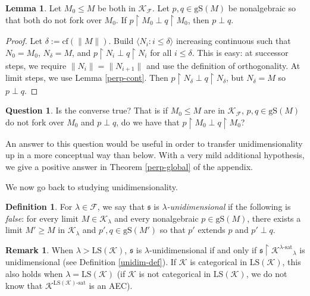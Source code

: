 \documentclass[12pt]{amsart}
\theoremstyle{definition}
\newtheorem{lem}[mydef]{Lemma}
\newtheorem{question}[mydef]{Question}
\newtheorem{defin}[mydef]{Definition}
\newtheorem{remark}[mydef]{Remark}
\begin{document}
\begin{lem}\label{perp-nf-1}
  Let $M_0 {\le} M$ be both in ${\mathcal{K}}_{\mathcal{F}}$. Let $p, q \in {\text{gS}} (M)$ be nonalgebraic so that both do not fork over $M_0$. If $p {\upharpoonright} M_0 \perp q {\upharpoonright} M_0$, then $p \perp q$.
\end{lem}
\begin{proof}
  Let $\delta := {\text{cf} ({\|M\|})}$. Build ${\langle {N_i : i \le \delta} \rangle}$ increasing continuous such that $N_0 = M_0$, $N_\delta = M$, and $p {\upharpoonright} N_i \perp q {\upharpoonright} N_i$ for all $i \le \delta$. This is easy: at successor steps, we require $\|N_i\| = \|N_{i + 1}\|$ and use the definition of orthogonality. At limit steps, we use Lemma \ref{perp-cont}. Then $p {\upharpoonright} N_\delta \perp q {\upharpoonright} N_\delta$, but $N_\delta = M$ so $p \perp q$.
\end{proof}

\begin{question}\label{perp-nf-question}
Is the converse true? That is if $M_0 {\le} M$ are in ${\mathcal{K}}_{\mathcal{F}}$, $p, q \in {\text{gS}} (M)$ do not fork over $M_0$ and $p \perp q$, do we have that $p {\upharpoonright} M_0 \perp q {\upharpoonright} M_0$?
\end{question}

An answer to this question would be useful in order to transfer unidimensionality up in a more conceptual way than below. With a very mild additional hypothesis, we give a positive answer in Theorem \ref{perp-global} of the appendix.

We now go back to studying unidimensionality. 

\begin{defin}
  For $\lambda \in {\mathcal{F}}$, we say that ${\mathfrak{s}}$ is \emph{$\lambda$-unidimensional} if the following is \emph{false}: for every limit $M \in {\mathcal{K}}_\lambda$ and every nonalgebraic $p \in {\text{gS}} (M)$, there exists a limit $M' {\ge} M$ in ${\mathcal{K}}_\lambda$ and $p', q \in {\text{gS}} (M')$ so that $p'$ extends $p$ and $p' \perp q$.
\end{defin}
\begin{remark}
  When $\lambda > {\text{LS}} ({\mathcal{K}})$, ${\mathfrak{s}}$ is $\lambda$-unidimensional if and only if ${\mathfrak{s}} {\upharpoonright} {{{{\mathcal{K}}}^{{{\lambda}}\text{-sat}}}}_\lambda$ is unidimensional (see Definition \ref{unidim-def}). If ${\mathcal{K}}$ is categorical in ${\text{LS}} ({\mathcal{K}})$, this also holds when $\lambda = {\text{LS}} ({\mathcal{K}})$ (if ${\mathcal{K}}$ is not categorical in ${\text{LS}} ({\mathcal{K}})$, we do not know that ${{{{\mathcal{K}}}^{{{{\text{LS}} ({\mathcal{K}})}}\text{-sat}}}}$ is an AEC).
\end{remark}
\end{document}
